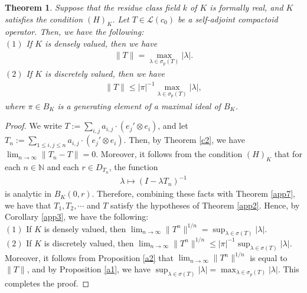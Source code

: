 \documentclass[12pt]{amsart}
\theoremstyle{plain}
\newtheorem{thm}[prop] {Theorem}
\theoremstyle{definition}
\begin{document}
\begin{thm} \label{a3}
  Suppose that the residue class field $k$ of $K$ is formally real, and $K$ satisfies the condition $(H)_K$. Let $T \in \mathcal{L}(c_0)$ be a self-adjoint compactoid operator. Then, we have the following:\\
  $(1)$ If $K$ is densely valued, then we have
  \begin{align*}
    \|T\| = \max_{\lambda \in \sigma_p(T)} |\lambda|.
  \end{align*}
  $(2)$ If $K$ is discretely valued, then we have 
  \begin{align*}
    \|T\| \le |\pi|^{-1} \max_{\lambda \in \sigma_p(T)} |\lambda|,
  \end{align*}
  where $\pi \in B_K$ is a generating element of a maximal ideal of $B_K$.
\end{thm}
\begin{proof}
  We write $T := \sum_{i,j} a_{i,j} \cdot (e_j' \otimes e_i)$, and let $T_n := \sum_{1 \le i,j \le n} a_{i,j} \cdot (e_j' \otimes e_i)$. Then, by Theorem \ref{c2}, we have $\lim_{n \to \infty} \|T_n - T\| = 0$. Moreover, it follows from the condition $(H)_K$ that for each $n \in \mathbb{N}$ and each $r \in D_{T_n}$, the function 
  \begin{align*}
    \lambda \mapsto (I - \lambda T_n)^{-1}
  \end{align*}
  is analytic in $B_K(0,r)$. Therefore, combining these facts with Theorem \ref{app7}, we have that $T_1, T_2, \cdots$ and $T$ satisfy the hypotheses of Theorem \ref{app2}. Hence, by Corollary \ref{app3}, we have the following: \\
  $(1)$ If $K$ is densely valued, then $\lim_{n \to \infty} \|T^n\|^{1/n} = \sup_{\lambda \in \sigma(T)} |\lambda|$. \\
  $(2)$ If $K$ is discretely valued, then $\lim_{n \to \infty} \|T^n\|^{1/n} \le |\pi|^{-1} \sup_{\lambda \in \sigma(T)} |\lambda|$. \\
  Moreover, it follows from Proposition \ref{a2} that $\lim_{n \to \infty} \|T^n\|^{1/n}$ is equal to $\|T\|$, and by Proposition \ref{a1}, we have $\sup_{\lambda \in \sigma(T)} |\lambda| = \max_{\lambda \in \sigma_p(T)} |\lambda|$. This completes the proof.
\end{proof}
\end{document}

